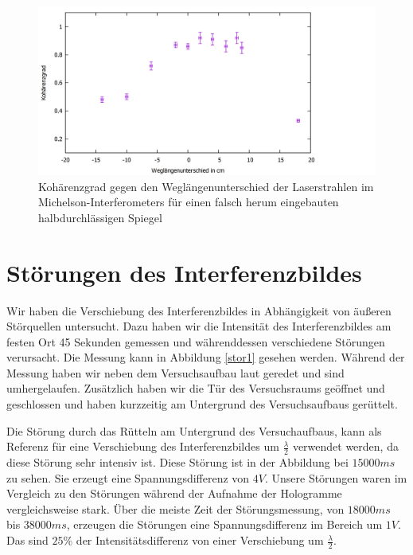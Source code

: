 \documentclass[12pt,a4paper]{article}
\begin{document}
\begin{figure}[h]
	\centering
	\includegraphics[scale = 0.3]{falsches_koplot.png}
	\caption{Kohärenzgrad gegen den Weglängenunterschied der Laserstrahlen im Michelson-Interferometers für einen falsch herum eingebauten halbdurchlässigen Spiegel}
	\label{kopl2}
\end{figure}

\section{Störungen des Interferenzbildes}

Wir haben die Verschiebung des Interferenzbildes in Abhängigkeit von äußeren Störquellen untersucht. Dazu haben wir die Intensität des Interferenzbildes am festen Ort 45 Sekunden gemessen und währenddessen verschiedene Störungen verursacht. Die Messung kann in Abbildung \ref{stor1} gesehen werden. Während der Messung haben wir neben dem Versuchsaufbau laut geredet und sind umhergelaufen. Zusätzlich haben wir die Tür des Versuchsraums geöffnet und geschlossen und haben kurzzeitig am Untergrund des Versuchsaufbaus gerüttelt. 

Die Störung durch das Rütteln am Untergrund des Versuchaufbaus, kann als Referenz für eine Verschiebung des Interferenzbildes um $\frac{\lambda}{2}$ verwendet werden, da diese Störung sehr intensiv ist. Diese Störung ist in der Abbildung bei $15000ms$ zu sehen. Sie erzeugt eine Spannungsdifferenz von $4V$. Unsere Störungen waren im Vergleich zu den Störungen während der Aufnahme der Hologramme vergleichsweise stark. Über die meiste Zeit der Störungsmessung, von $18000ms$ bis $38000ms$, erzeugen die Störungen eine Spannungsdifferenz im Bereich um $1V$. Das sind $25\%$ der Intensitätsdifferenz von einer Verschiebung um $\frac{\lambda}{2}$. 
\end{document}
